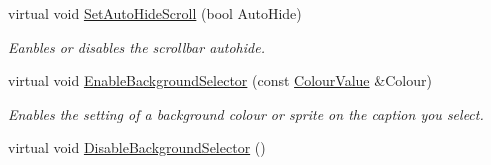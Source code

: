 \begin{DoxyCompactItemize}
virtual void \hyperlink{classphys_1_1UI_1_1ListBox_a60fc5c1907df6d83217b25c2c8f15f48}{SetAutoHideScroll} (bool AutoHide)
\begin{DoxyCompactList}\small\item\em Eanbles or disables the scrollbar autohide. \item\end{DoxyCompactList}\item 
virtual void \hyperlink{classphys_1_1UI_1_1ListBox_a2f3612cc6062a279f0b6f69a1b2fc4eb}{EnableBackgroundSelector} (const \hyperlink{classphys_1_1ColourValue}{ColourValue} \&Colour)
\begin{DoxyCompactList}\small\item\em Enables the setting of a background colour or sprite on the caption you select. \item\end{DoxyCompactList}\item 
\hypertarget{classphys_1_1UI_1_1ListBox_a05191b1f2515dead89abbcd6bd63b4d0}{
virtual void \hyperlink{classphys_1_1UI_1_1ListBox_a05191b1f2515dead89abbcd6bd63b4d0}{DisableBackgroundSelector} ()}
\label{classphys_1_1UI_1_1ListBox_a05191b1f2515dead89abbcd6bd63b4d0}


\end{DoxyCompactItemize}
